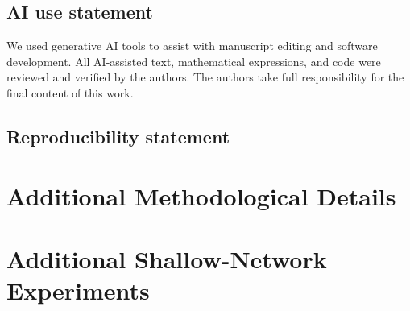 \documentclass{article}
\begin{document}

\subsection*{AI use statement}

We used generative AI tools to assist with manuscript editing and
software development. All AI-assisted text, mathematical expressions,
and code were reviewed and verified by the authors. The authors take
full responsibility for the final content of this work.


\subsection*{Reproducibility statement}









\appendix


\section{Additional Methodological Details}
\label{app:method}

%


\section{Additional Shallow-Network Experiments}
\label{app:shallow}
\end{document}
